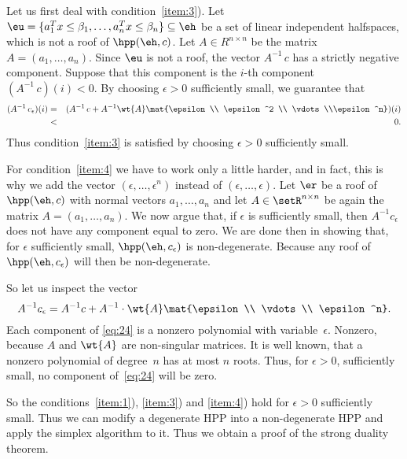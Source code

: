 Let us  first deal with condition~\ref{item:3}). Let 
$\eu=\{a_1^Tx\leq\beta_1,\ldots,a_n^Tx\leq\beta_n\}\subseteq\eh$ be a set of linear independent
halfspaces, which is not a roof of $\hpp(\eh,c)$. 
Let $A \in R^{n\times n}$ be the matrix $A = (a_1,\ldots,a_n)$. 
Since $\eu$ is not a roof, the vector $A^{-1}\,c $ has a strictly
negative component. Suppose that this component is the $i$-th
component $(A^{-1}\,c)(i)<0$.  By choosing $\epsilon>0$ sufficiently small,
we guarantee that   
\begin{eqnarray}
  (A^{-1}\,c_\epsilon)(i) & = & (A^{-1}\, c + A^{-1}\wt{A} \mat{\epsilon \\ \epsilon^2 \\ \vdots \\\epsilon^n})(i)\label{eq:23}\\
                & < & 0. 
\end{eqnarray}
Thus condition~\ref{item:3} is satisfied by choosing $\epsilon>0$
sufficiently small. 

For  condition~\ref{item:4} we have to work only a little harder, and
in fact, this is why we add the vector $(\epsilon,\ldots,\epsilon^n)$ instead of
$(\epsilon,\ldots,\epsilon)$. Let $\er$ be a roof of $\hpp(\eh,c)$ with normal vectors
$a_1,\ldots,a_n$ and let $A \in \setR^{n\times n}$ be again the matrix $A=(a_1,\ldots,a_n)$.
We now argue that, if  $\epsilon$ is sufficiently small, then $A^{-1}c_\epsilon$
does not have any component equal to  zero.  We are done then in
showing that, for $\epsilon$ sufficiently small, $\hpp(\eh,c_\epsilon)$ is
non-degenerate. Because any roof of $\hpp(\eh,c_\epsilon)$ will then be
non-degenerate. 

So let us inspect the vector 
\begin{equation}
  \label{eq:24}
  A^{-1} c_\epsilon = A^{-1}c + A^{-1}\cdot \wt{A} \mat{\epsilon \\ \vdots \\ \epsilon^n}. 
\end{equation}
Each component of \eqref{eq:24} is a nonzero polynomial with
variable~$\epsilon$.  Nonzero, because $A$ and $\wt{A}$ are non-singular
matrices. It is well known, that a nonzero polynomial of degree~$n$
has at most $n$ roots. Thus, for $\epsilon>0$, sufficiently  small, no
component of~\eqref{eq:24} will be zero. 



So the conditions~\ref{item:1}), \ref{item:3}) and \ref{item:4}) hold
for $\epsilon>0$ sufficiently small. Thus we can modify a degenerate HPP into
a non-degenerate HPP and apply the simplex algorithm to it. Thus we
obtain a proof of the strong duality theorem. 


